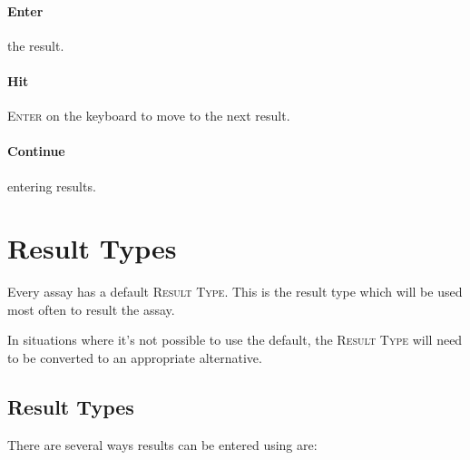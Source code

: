 \paragraph{Enter} the result.\\



\paragraph{Hit} {\faKeyboardO } \textsc{Enter} on the keyboard to move to the next result.\\


\paragraph{Continue} entering results.\\





\section{Result Types}\label{sec:convert_result}
Every assay has a default \textsc{Result Type}. This is the result type which will be used most often to result the assay.

In situations where it's not possible to use the default, the \textsc{Result Type} will need to be converted to an appropriate alternative.

\subsection{Result Types}
There are several ways results can be entered using \gls{are}:


